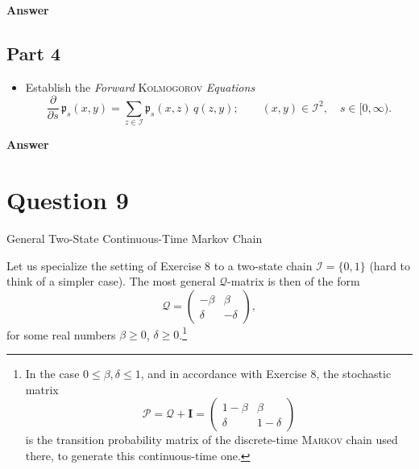 \documentclass[letterpaper]{article}
\begin{document}
	\textbf{Answer}

\clearpage
\subsection{Part 4}
\begin{itemize}
			
			\item[(f)] Establish the \textit{Forward} \textsc{Kolmogorov} \textit{Equations}
			\begin{equation}
				\frac{\partial}{\partial s}\, \mathfrak{p}_s(x,y) = \sum_{z \in \mathcal{I}} \mathfrak{p}_s(x,z)\, q(z,y); \qquad (x,y) \in \mathcal{I}^2, \quad s \in [0,\infty). \tag{0.9}
			\end{equation}
		\end{itemize}
		
		\textbf{Answer}
		
		\clearpage
		
		\section{Question 9}
		
		{\color{deepred}   General Two-State Continuous-Time Markov Chain} 
		
		Let us specialize the setting of Exercise 8 to a two-state chain $\mathcal{I} = \{0, 1\}$ (hard to think of a simpler case). The most general $\mathcal{Q}$-matrix is then of the form
		\[
		\mathcal{Q} = \begin{pmatrix} -\beta & \beta \\ \delta & -\delta \end{pmatrix},
		\]
		for some real numbers $\beta \geq 0$, $\delta \geq 0$.\footnote{In the case $0 \leq \beta, \delta \leq 1$, and in accordance with Exercise 8, the stochastic matrix
			\[
			\mathcal{P} = \mathcal{Q} + \mathbf{I} = \begin{pmatrix} 1 - \beta & \beta \\ \delta & 1 - \delta \end{pmatrix}
			\]
			is the transition probability matrix of the discrete-time \textsc{Markov} chain used there, to generate this continuous-time one.}
		
\end{document}
